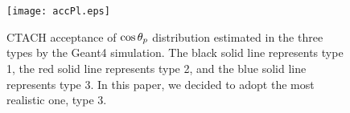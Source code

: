 \begin{figure}[h]
  \centering
  \texttt{[image: accPl.eps]}
  \caption{CTACH acceptance of $\cos{\theta_p}$ distribution estimated in the three types by the Geant4 simulation. The black solid line represents type 1, the red solid line represents type 2, and the blue solid line represents type 3. In this paper, we decided to adopt the most realistic one, type 3.}
  \label{fig-accPl}
\end{figure}

\begin{comment}

\begin{table}[!h] 
  \begin{center}
  \caption{Numerical values of the acceptance estimated in type 3 in the $\Kz$ scattering angular range of \textbf{$0.6<\costkz<0.65$}.}
  \centering
  \begin{threeparttable}
    \begin{tabular}{cc}
    Bin ($\costp$) & Acceptance (\%) \\
    \midrule\midrule
    $-1.0 - -0.9$ & 27.489 \\
    \midrule
    $-0.9 - -0.8$ & 24.603 \\
    \midrule
    $-0.8 - -0.7$ & 22.733 \\
    \midrule
    $-0.7 - -0.6$ & 18.712 \\
    \midrule
    $-0.6 - -0.5$ & 16.542 \\
    \midrule
    $-0.5 - -0.4$ & 13.909 \\
    \midrule
    $-0.4 - -0.3$ & 11.374 \\
    \midrule
    $-0.3 - -0.2$ & 8.763 \\
    \midrule
    $-0.2 - -0.1$ & 6.188 \\
    \midrule
    $-0.1 - 0.0$ & 4.260 \\
    \midrule
    $0.0 - 0.1$ & 4.182 \\
    \midrule
    $0.1 - 0.2$ & 6.132 \\
    \midrule
    $0.2 - 0.3$ & 9.344 \\
    \midrule
    $0.3 - 0.4$ & 11.366 \\
    \midrule
    $0.4 - 0.5$ & 14.262 \\
    \midrule
    $0.5 - 0.6$ & 16.293 \\
    \midrule
    $0.6 - 0.7$ & 17.393 \\
    \midrule
    $0.7 - 0.8$ & 21.254 \\
    \midrule
    $0.8 - 0.9$ & 24.321 \\
    \midrule
    $0.9 - 1.0$ & 26.166 \\
    \end{tabular}
  \end{threeparttable}
  \label{tab-Pl-acc_32}
  \end{center}
\end{table}


\end{comment}
